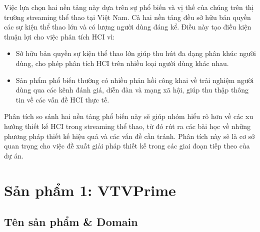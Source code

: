 Việc lựa chọn hai nền tảng này dựa trên sự phổ biến và vị thế của chúng trên thị trường streaming thể thao tại Việt Nam. Cả hai nền tảng đều sở hữu bản quyền các sự kiện thể thao lớn và có lượng người dùng đáng kể. Điều này tạo điều kiện thuận lợi cho việc phân tích HCI vì:

\begin{itemize}
  \item Sở hữu bản quyền sự kiện thể thao lớn giúp thu hút đa dạng phân khúc người dùng, cho phép phân tích HCI trên nhiều loại người dùng khác nhau.
  \item Sản phẩm phổ biến thường có nhiều phản hồi công khai về trải nghiệm người dùng qua các kênh đánh giá, diễn đàn và mạng xã hội, giúp thu thập thông tin về các vấn đề HCI thực tế.
\end{itemize}

Phân tích so sánh hai nền tảng phổ biến này sẽ giúp nhóm hiểu rõ hơn về các xu hướng thiết kế HCI trong streaming thể thao, từ đó rút ra các bài học về những phương pháp thiết kế hiệu quả và các vấn đề cần tránh. Phân tích này sẽ là cơ sở quan trọng cho việc đề xuất giải pháp thiết kế trong các giai đoạn tiếp theo của dự án.

\section{Sản phẩm 1: VTVPrime}

\subsection{Tên sản phẩm \& Domain}

